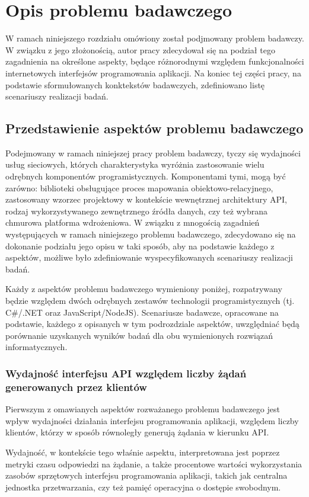 \chapter{Opis problemu badawczego}
W ramach niniejszego rozdziału omówiony został podjmowany problem badawczy. W związku z jego złożonością, autor pracy zdecydował się na podział tego zagadnienia na określone aspekty, będące różnorodnymi względem funkcjonalności internetowych interfejsów programowania aplikacji. Na koniec tej części pracy, na podstawie sformułowanych konktekstów badawczych, zdefiniowano listę scenariuszy realizacji badań.
\section{Przedstawienie aspektów problemu badawczego}
Podejmowany w ramach niniejszej pracy problem badawczy, tyczy się wydajności usług sieciowych, których charakterystyka wyróżnia zastosowanie wielu odrębnych komponentów programistycznych. Komponentami tymi, mogą być zarówno: biblioteki obsługujące proces mapowania obiektowo-relacyjnego, zastosowany wzorzec projektowy w kontekście wewnętrznej architektury API, rodzaj wykorzystywanego zewnętrznego źródła danych, czy też wybrana chmurowa platforma wdrożeniowa. W związku z mnogością zagadnień występujących w ramach niniejszego problemu badawczego, zdecydowano się na dokonanie podziału jego opisu w taki sposób, aby na podstawie każdego z aspektów, możliwe było zdefiniowanie wyspecyfikowanych scenariuszy realizacji badań.

Każdy z aspektów problemu badawczego wymieniony poniżej, rozpatrywany będzie względem dwóch odrębnych zestawów technologii programistycznych (tj. C\#/.NET oraz JavaScript/NodeJS). Scenariusze badawcze, opracowane na podstawie, każdego z opisanych w tym podrozdziale aspektów, uwzględniać będą porównanie uzyskanych wyników badań dla obu wymienionych rozwiązań informatycznych.
\subsection*{Wydajność interfejsu API względem liczby żądań generowanych przez klientów}
Pierwszym z omawianych aspektów rozważanego problemu badawczego jest wpływ wydajności działania interfejsu programowania aplikacji, względem liczby klientów, którzy w sposób równoległy generują żądania w kierunku API.

Wydajność, w kontekście tego właśnie aspektu, interpretowana jest poprzez metryki czasu odpowiedzi na żądanie, a także procentowe wartości wykorzystania zasobów sprzętowych interfejsu programowania aplikacji, takich jak centralna jednostka przetwarzania, czy też pamięć operacyjna o dostępie swobodnym.

